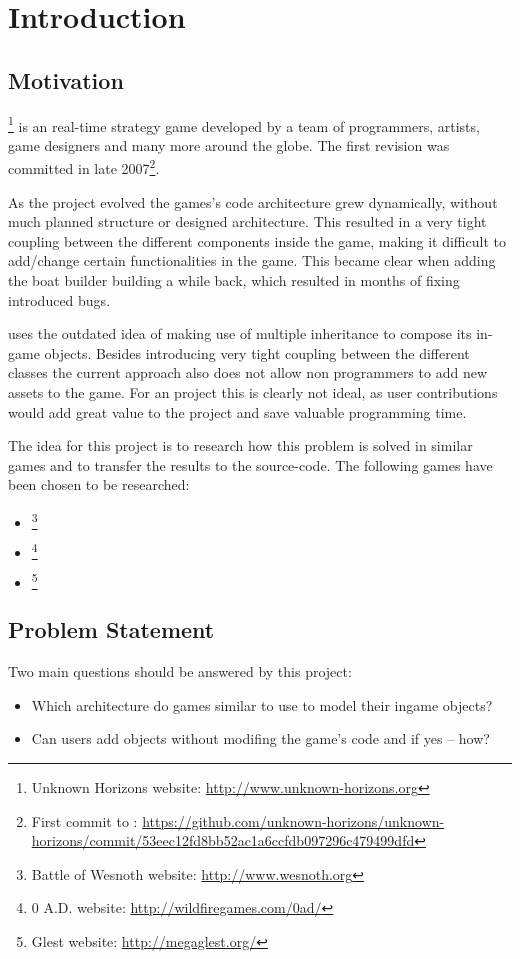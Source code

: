 

\section{Introduction}

\subsection{Motivation}
\UH{}\footnote{Unknown Horizons website: \url{http://www.unknown-horizons.org}} is an \OS{} real-time strategy game developed by a team of programmers, artists, game
designers and many more around the globe. The first revision was committed in late 2007\footnote{First commit to \UH{}:
\url{https://github.com/unknown-horizons/unknown-horizons/commit/53eec12fd8bb52ac1a6ccfdb097296c479499dfd}}.

As the project evolved the games's code architecture grew dynamically, without much planned structure or
designed architecture. This resulted in a very tight coupling between the different components inside the game, making
it difficult to add/change certain functionalities in the game. This became clear when adding the boat builder building
a while back, which resulted in months of fixing introduced bugs.

\UH{} uses the outdated idea of making use of multiple inheritance to compose its in-game objects. Besides introducing
very tight coupling between the different classes the current approach also does not allow non programmers to add new
assets to the game. For an \OS{} project this is clearly not ideal, as user contributions would add great value to the
project and save valuable programming time.

The idea for this project is to research how this problem is solved in similar \OS{} games and to transfer the results to
the \UH source-code. The following games have been chosen to be researched:
\begin{itemize}
    \item \BOW{}\footnote{Battle of Wesnoth website: \url{http://www.wesnoth.org}}
    \item \AD{}\footnote{0 A.D. website: \url{http://wildfiregames.com/0ad/}}
    \item \GLEST{}\footnote{Glest website: \url{http://megaglest.org/}}
\end{itemize}


\subsection{Problem Statement}
Two main questions should be answered by this project:
\begin{itemize}
    \item Which architecture do \OS{} games similar to \UH use to model their ingame objects?
    \item Can users add objects without modifing the game's code and if yes -- how?
\end{itemize}

